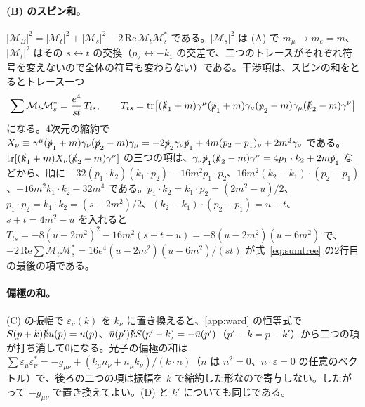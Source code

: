 \documentclass[a4paper,10pt]{ltjsarticle}
\begin{document}
\paragraph{(B) のスピン和。}$|\mathcal M_B|^2=|\mathcal M_t|^2+|\mathcal M_s|^2-2\,\mathrm{Re}\,\mathcal M_t\mathcal M_s^*$ である。$|\mathcal M_s|^2$ は (A) で $m_\mu\to m_e=m$、$|\mathcal M_t|^2$ はその $s\leftrightarrow t$ の交換（$p_2\leftrightarrow-k_1$ の交差で、二つのトレースがそれぞれ符号を変えないので全体の符号も変わらない）である。干渉項は、スピンの和をとるとトレース一つ
\begin{equation*}
\sum\mathcal M_t\mathcal M_s^*=\frac{e^4}{st}\,T_{ts},\qquad
T_{ts}=\mathrm{tr}\bigl[(\slashed k_1+m)\gamma^\mu(\slashed p_1+m)\gamma_\nu(\slashed p_2-m)\gamma_\mu(\slashed k_2-m)\gamma^\nu\bigr]
\end{equation*}
になる。4次元の縮約で $X_\nu\equiv\gamma^\mu(\slashed p_1+m)\gamma_\nu(\slashed p_2-m)\gamma_\mu=-2\slashed p_2\gamma_\nu\slashed p_1+4m(p_2-p_1)_\nu+2m^2\gamma_\nu$ である。$\mathrm{tr}[(\slashed k_1+m)X_\nu(\slashed k_2-m)\gamma^\nu]$ の三つの項は、$\gamma_\nu\slashed p_1(\slashed k_2-m)\gamma^\nu=4p_1\cdot k_2+2m\slashed p_1$ などから、順に $-32(p_1\cdot k_2)(k_1\cdot p_2)-16m^2p_1\cdot p_2$、$16m^2(k_2-k_1)\cdot(p_2-p_1)$、$-16m^2k_1\cdot k_2-32m^4$ である。$p_1\cdot k_2=k_1\cdot p_2=(2m^2-u)/2$、$p_1\cdot p_2=k_1\cdot k_2=(s-2m^2)/2$、$(k_2-k_1)\cdot(p_2-p_1)=u-t$、$s+t=4m^2-u$ を入れると $T_{ts}=-8(u-2m^2)^2-16m^2(s+t-u)=-8(u-2m^2)(u-6m^2)$ で、$-2\,\mathrm{Re}\sum\mathcal M_t\mathcal M_s^*=16e^4(u-2m^2)(u-6m^2)/(st)$ が式~\eqref{eq:sumtree} の2行目の最後の項である。

\paragraph{偏極の和。}(C) の振幅で $\varepsilon_\nu(k)$ を $k_\nu$ に置き換えると、\ref{app:ward} の恒等式で $S(p+k)\slashed ku(p)=u(p)$、$\bar u(p')\slashed kS(p'-k)=-\bar u(p')$（$p'-k=p-k'$）から二つの項が打ち消して0になる。光子の偏極の和は $\sum\varepsilon_\mu\varepsilon^*_\nu=-g_{\mu\nu}+(k_\mu n_\nu+n_\mu k_\nu)/(k\cdot n)$（$n$ は $n^2=0$、$n\cdot\varepsilon=0$ の任意のベクトル）で、後ろの二つの項は振幅を $k$ で縮約した形なので寄与しない。したがって $-g_{\mu\nu}$ で置き換えてよい。(D) と $k'$ についても同じである。
\end{document}
